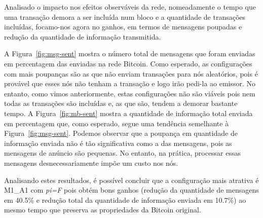 Analisado o impacto nos efeitos observáveis da rede, nomeadamente o tempo que uma transação demora a ser incluída num bloco e a quantidade de transações incluídas, focamo-nos agora no ganhos, em termos de mensagens poupadas e redução da quantidade de informação transmitida.


A Figura~\ref{fig:msg-sent} mostra o número total de mensagens que foram enviadas em percentagem das enviadas na rede Bitcoin.
Como esperado, as configurações com mais poupanças são as que não enviam transações para nós aleatórios, pois é provável que esses nós não tenham a transação e logo irão pedi-la ao emissor.
No entanto, como vimos anteriormente, estas configurações não são viáveis pois nem todas as transações são incluídas e, as que são, tendem a demorar bastante tempo.
A Figura~\ref{fig:mb-sent} mostra a quantidade de informação total enviada em percentagem que, como esperado, segue uma tendência semelhante à Figura~\ref{fig:msg-sent}.
Podemos observar que a poupança em quantidade de informação enviada não é tão significativa como a das mensagens, pois as mensagens de anúncio são pequenas.
No entanto, na prática, processar essas mensagens desnecessariamente impõe um custo nos nós.

Analisando estes resultados, é possível concluir que a configuração mais atrativa é M1\_A1 com \textsl{pi=F} pois obtém bons ganhos
(redução da quantidade de mensagens em 40.5\% e  redução total da quantidade de informação enviada em 10.7\%) ao mesmo tempo que preserva as propriedades da Bitcoin original.
